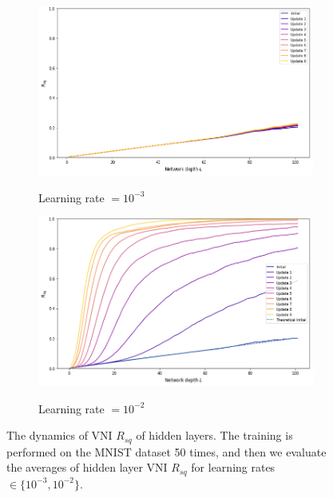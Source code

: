 \begin{figure}
\centering

\newcommand{\myWidth}{0.98\linewidth}
\begin{subfigure}{\myWidth}
    \centering
    \caption{Learning rate $=10^{-3}$}
    \includegraphics[width=\myWidth]{img/Sec5/sim1/Rsq_for_each_layer_0001(hard-tanh_50ave)}
    \label{fig:sec5sim15_a}
\end{subfigure}
\begin{subfigure}{\myWidth}
    \centering
    \caption{Learning rate $=10^{-2}$}
    \includegraphics[width=\myWidth]{img/Sec5/sim1/Rsq_for_each_layer(hard-tanh_50ave)}
    \label{fig:sec5sim15_b}
\end{subfigure}
\caption[The dynamics of VNI $R_{sq}$ of hidden layers.]
{
    The dynamics of VNI $R_{sq}$ of hidden layers.
The training is performed on the MNIST dataset 50 times, and then we evaluate the averages of hidden layer
VNI $R_{sq}$ for learning rates $\in\{10^{-3}, 10^{-2}\}$.
}
\label{fig:sec5_sim15}
\end{figure}
